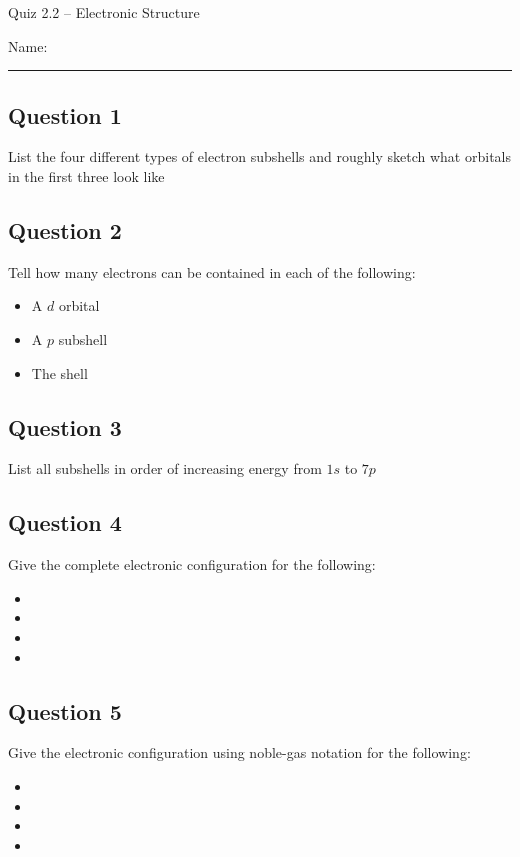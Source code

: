 \documentclass[11pt, letterpaper]{memoir}
\begin{document}
	\begin{center}
		{\large Quiz 2.2 --	Electronic Structure}
	\end{center}
	{\large Name: \rule[-1mm]{4in}{.1pt} 


\subsection*{Question 1}
List the four different types of electron subshells and roughly sketch what orbitals in the first three look like

\vspace{2em}
\subsection*{Question 2}
Tell how many electrons can be contained in each of the following:

\begin{itemize}
	\item A $d$ orbital
	\item A $p$ subshell
	\item The  shell
\end{itemize}

\subsection*{Question 3}
List all subshells in order of increasing energy from $1s$ to $7p$

\vspace{1em}
\subsection*{Question 4}
Give the complete electronic configuration for the following:
\begin{itemize}
	\item {}
	\item {}
	\item {}
	\item {}
\end{itemize}

\subsection*{Question 5}
Give the electronic configuration using noble-gas notation for the following:
\begin{itemize}
	\item {}
	\item {}
	\item {}
	\item {}
\end{itemize}

}
\end{document}

